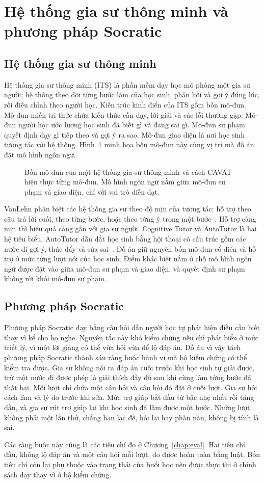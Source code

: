 \section{Hệ thống gia sư thông minh và phương pháp Socratic}

\subsection{Hệ thống gia sư thông minh}
Hệ thống gia sư thông minh (ITS) là phần mềm dạy học mô phỏng một gia sư người: hệ thống theo dõi từng bước làm của học sinh, phản hồi và gợi ý đúng lúc, rồi điều chỉnh theo người học. Kiến trúc kinh điển của ITS gồm bốn mô-đun. Mô-đun miền tri thức chứa kiến thức cần dạy, lời giải và các lỗi thường gặp. Mô-đun người học ước lượng học sinh đã biết gì và đang sai gì. Mô-đun sư phạm quyết định dạy gì tiếp theo và gợi ý ra sao. Mô-đun giao diện là nơi học sinh tương tác với hệ thống. Hình~\ref{fig:its-modules} minh họa bốn mô-đun này cùng vị trí mà đồ án đặt mô hình ngôn ngữ.

\begin{figure}[ht]
\centering

\caption{Bốn mô-đun của một hệ thống gia sư thông minh và cách CAVAT hiện thực từng mô-đun. Mô hình ngôn ngữ nằm giữa mô-đun sư phạm và giao diện, chỉ với vai trò diễn đạt.}
\label{fig:its-modules}
\end{figure}

VanLehn phân biệt các hệ thống gia sư theo độ mịn của tương tác: hỗ trợ theo câu trả lời cuối, theo từng bước, hoặc theo từng ý trong một bước~\cite{vanlehn2011}. Hỗ trợ càng mịn thì hiệu quả càng gần với gia sư người. Cognitive Tutor và AutoTutor là hai hệ tiêu biểu. AutoTutor dẫn dắt học sinh bằng hội thoại có cấu trúc gồm các nước đi gợi ý, thúc đẩy và sửa sai~\cite{graesser2005}. Đồ án giữ nguyên bốn mô-đun cổ điển và hỗ trợ ở mức từng lượt nói của học sinh. Điểm khác biệt nằm ở chỗ mô hình ngôn ngữ được đặt vào giữa mô-đun sư phạm và giao diện, và quyết định sư phạm không rời khỏi mô-đun sư phạm.

\subsection{Phương pháp Socratic}\label{sec:socratic-ref}
Phương pháp Socratic dạy bằng câu hỏi dẫn người học tự phát hiện điều cần biết thay vì kể cho họ nghe. Nguyên tắc này khó kiểm chứng nếu chỉ phát biểu ở mức triết lý, vì một lời giảng có thể vừa hỏi vừa để lộ đáp án. Đồ án vì vậy tách phương pháp Socratic thành sáu ràng buộc hành vi mà bộ kiểm chứng có thể kiểm tra được. Gia sư không nói ra đáp án cuối trước khi học sinh tự giải được, trừ một nước đi được phép là giải thích đầy đủ sau khi cùng làm từng bước đã thất bại. Mỗi lượt chỉ chứa một câu hỏi và câu hỏi đó đặt ở cuối lượt. Gia sư hỏi cách làm và lý do trước khi sửa. Mức trợ giúp bắt đầu từ bậc nhẹ nhất rồi tăng dần, và gia sư rút trợ giúp lại khi học sinh đã làm được một bước. Những lượt không phải một lần thử, chẳng hạn lạc đề, hỏi lại hay phàn nàn, không bị tính là sai.

Các ràng buộc này cũng là các tiêu chí đo ở Chương~\ref{chap:eval}. Hai tiêu chí đầu, không lộ đáp án và một câu hỏi mỗi lượt, đo được hoàn toàn bằng luật. Bốn tiêu chí còn lại phụ thuộc vào trạng thái của buổi học nên được thực thi ở chính sách dạy thay vì ở bộ kiểm chứng.
